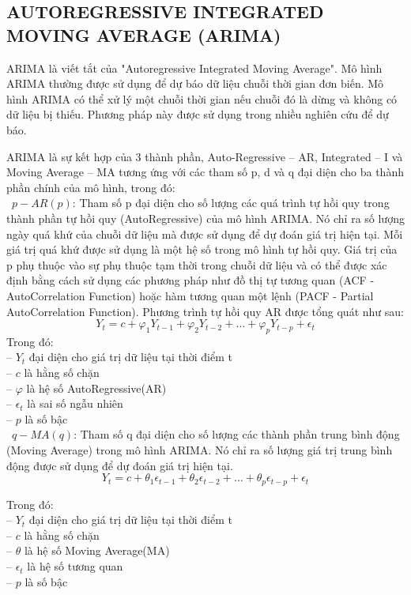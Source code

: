 \documentclass[conference]{IEEEtran}
\begin{document}
\subsection{AUTOREGRESSIVE INTEGRATED MOVING AVERAGE (ARIMA)}

ARIMA là viết tắt của "Autoregressive Integrated Moving Average". Mô hình ARIMA thường được sử dụng để dự báo dữ liệu chuỗi thời gian đơn biến. Mô hình ARIMA có thể xử lý một chuỗi thời gian nếu chuỗi đó là dừng và không có dữ liệu bị thiếu. Phương pháp này được sử dụng trong nhiều nghiên cứu để dự báo.

ARIMA là sự kết hợp của 3 thành phần, Auto-Regressive – AR, Integrated – I và Moving Average – MA tương ứng với các tham số p, d và q đại diện cho ba thành phần chính của mô hình, trong đó:
\\
\indent\textbullet\ \(p-AR(p)\): Tham số p đại diện cho số lượng các quá trình tự hồi quy trong thành phần tự hồi quy (AutoRegressive) của mô hình ARIMA. Nó chỉ ra số lượng ngày quá khứ của chuỗi dữ liệu mà được sử dụng để dự đoán giá trị hiện tại. Mỗi giá trị quá khứ được sử dụng là một hệ số trong mô hình tự hồi quy. Giá trị của p phụ thuộc vào sự phụ thuộc tạm thời trong chuỗi dữ liệu và có thể được xác định bằng cách sử dụng các phương pháp như đồ thị tự tương quan (ACF - AutoCorrelation Function) hoặc hàm tương quan một lệnh (PACF - Partial AutoCorrelation Function). Phương trình tự hồi quy AR được tổng quát như sau:\\
\[
    Y_t = c + \varphi_1 Y_{t-1} + \varphi_2 Y_{t-2} + \ldots + \varphi_p Y_{t-p} + \epsilon_t
\]
Trong đó: \\
\indent -- \(Y_t\) đại diện cho giá trị dữ liệu tại thời điểm t\\
\indent -- \(c\) là hằng số chặn\\
\indent -- \(\varphi\) là hệ số AutoRegressive(AR)\\
\indent -- \(\epsilon_t\) là sai số ngẫu nhiên \\
\indent -- \(p\) là số bậc \\

\indent\textbullet\ \(q-MA(q)\): Tham số q đại diện cho số lượng các thành phần trung bình động (Moving Average) trong mô hình ARIMA. Nó chỉ ra số lượng giá trị trung bình động được sử dụng để dự đoán giá trị hiện tại.\\
\[
    Y_t = c + \theta_1 \epsilon_{t-1} + \theta_2 \epsilon_{t-2} + \ldots + \theta_p \epsilon_{t-p} + \epsilon_t
\]

Trong đó: \\
\indent -- \(Y_t\) đại diện cho giá trị dữ liệu tại thời điểm t\\
\indent -- \(c\) là hằng số chặn\\
\indent -- \(\theta\) là hệ số Moving Average(MA)\\
\indent -- \(\epsilon_t\) là hệ số tương quan\\
\indent -- \(p\) là số bậc \\
\end{document}
